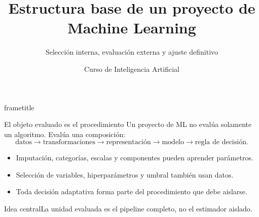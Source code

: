 \documentclass[aspectratio=169,10pt]{beamer}
\title[Estructura base de un proyecto de ML]{Estructura base de un proyecto de Machine Learning}
\subtitle{Selección interna, evaluación externa y ajuste definitivo}
\author{Curso de Inteligencia Artificial}
\institute{Semana 7 · Presentación complementaria}
\date{}
\newcommand{\idea}[1]{\begin{block}{Idea central}#1\end{block}}
\begin{document}
\begin{frame}[plain]
  \begin{beamercolorbox}[wd=\paperwidth,ht=\paperheight,sep=2em]{frametitle}
    \vfill
    {\Huge\bfseries\inserttitle\par}\vspace{.45em}
    {\color{UAPGold}\Large\insertsubtitle\par}\vspace{1.2em}
    \par
    \vfill {\color{UAPGold}\large\insertauthor\par}{\color{white}\insertinstitute\par}
  \end{beamercolorbox}
\end{frame}

\begin{frame}{El objeto evaluado es el procedimiento}
  Un proyecto de ML no evalúa solamente un algoritmo. Evalúa una composición:
  \[
    \text{datos}\rightarrow\text{transformaciones}\rightarrow\text{representación}
    \rightarrow\text{modelo}\rightarrow\text{regla de decisión}.
  \]
  \begin{itemize}
    \item Imputación, categorías, escalas y componentes pueden aprender parámetros.
    \item Selección de variables, hiperparámetros y umbral también usan datos.
    \item Toda decisión adaptativa forma parte del procedimiento que debe aislarse.
  \end{itemize}
  \idea{La unidad evaluada es el pipeline completo, no el estimador aislado.}
\end{frame}
\end{document}
